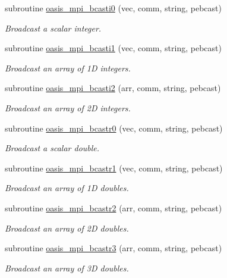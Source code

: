 \begin{DoxyCompactItemize}
subroutine \hyperlink{interfacemod__oasis__mpi_1_1oasis__mpi__bcast_a773c919f8d2e8e9f5684d8ab474adf67}{oasis\+\_\+mpi\+\_\+bcasti0} (vec, comm, string, pebcast)
\begin{DoxyCompactList}\small\item\em Broadcast a scalar integer. \end{DoxyCompactList}\item 
subroutine \hyperlink{interfacemod__oasis__mpi_1_1oasis__mpi__bcast_a55099ffd2a5c5395e84381aac600f925}{oasis\+\_\+mpi\+\_\+bcasti1} (vec, comm, string, pebcast)
\begin{DoxyCompactList}\small\item\em Broadcast an array of 1D integers. \end{DoxyCompactList}\item 
subroutine \hyperlink{interfacemod__oasis__mpi_1_1oasis__mpi__bcast_a37a7d70970597e2482d9972e2eec30fb}{oasis\+\_\+mpi\+\_\+bcasti2} (arr, comm, string, pebcast)
\begin{DoxyCompactList}\small\item\em Broadcast an array of 2D integers. \end{DoxyCompactList}\item 
subroutine \hyperlink{interfacemod__oasis__mpi_1_1oasis__mpi__bcast_af36d9d1af755437ac9291e95cf75b1b2}{oasis\+\_\+mpi\+\_\+bcastr0} (vec, comm, string, pebcast)
\begin{DoxyCompactList}\small\item\em Broadcast a scalar double. \end{DoxyCompactList}\item 
subroutine \hyperlink{interfacemod__oasis__mpi_1_1oasis__mpi__bcast_a0e0e3c41f07c25b5b9d6f0f452eb0178}{oasis\+\_\+mpi\+\_\+bcastr1} (vec, comm, string, pebcast)
\begin{DoxyCompactList}\small\item\em Broadcast an array of 1D doubles. \end{DoxyCompactList}\item 
subroutine \hyperlink{interfacemod__oasis__mpi_1_1oasis__mpi__bcast_a83b3e5f67615db7af2bd599a067c7691}{oasis\+\_\+mpi\+\_\+bcastr2} (arr, comm, string, pebcast)
\begin{DoxyCompactList}\small\item\em Broadcast an array of 2D doubles. \end{DoxyCompactList}\item 
subroutine \hyperlink{interfacemod__oasis__mpi_1_1oasis__mpi__bcast_aec70b77613425bddc9002f1dc21db1d2}{oasis\+\_\+mpi\+\_\+bcastr3} (arr, comm, string, pebcast)
\begin{DoxyCompactList}\small\item\em Broadcast an array of 3D doubles. \end{DoxyCompactList}\end{DoxyCompactItemize}


